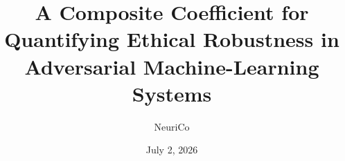 \documentclass{amsart}
\title[Quantifying Ethical Robustness in Adversarial ML Systems]{A Composite Coefficient for Quantifying Ethical Robustness in Adversarial Machine-Learning Systems}
\author{NeuriCo}
\date{July 2, 2026}
\theoremstyle{definition}
\theoremstyle{remark}
\numberwithin{equation}{section}
\begin{document}
\begin{abstract}

\end{abstract}

\maketitle









\end{document}
